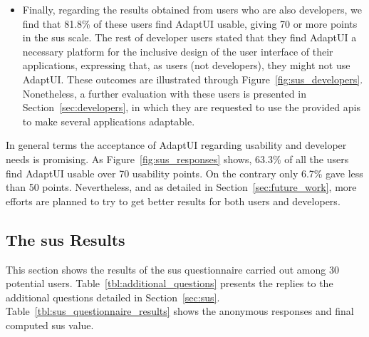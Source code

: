 \begin{itemize}
  \item Finally, regarding the results obtained from users who are also 
  developers, we find that 81.8\% of these users find AdaptUI usable, 
  giving 70 or more points in the \ac{sus} scale. The rest of developer users 
  stated that they find AdaptUI a necessary platform for the inclusive design of 
  the user interface of their applications, expressing that, as users (not 
  developers), they might not use AdaptUI. These outcomes are illustrated
  through Figure~\ref{fig:sus_developers}. Nonetheless, a further evaluation
  with these users is presented in Section~\ref{sec:developers}, in which they
  are requested to use the provided \acp{api} to make several applications
  adaptable.
\end{itemize}

In general terms the acceptance of AdaptUI regarding usability and developer
needs is promising. As Figure~\ref{fig:sus_responses} shows, 63.3\% of all 
the users find AdaptUI usable over 70 usability points. On the contrary only
6.7\% gave less than 50 points. Nevertheless, and as detailed in 
Section~\ref{sec:future_work}, more efforts are planned to try to get better
results for both users and developers.

\subsection{The \ac{sus} Results}
\label{sec:sus_results}

This section shows the results of the \ac{sus} questionnaire carried out among
30 potential users. Table~\ref{tbl:additional_questions} presents the replies 
to the additional questions detailed in Section~\ref{sec:sus}.
Table~\ref{tbl:sus_questionnaire_results} shows the anonymous responses and final
computed \ac{sus} value.

